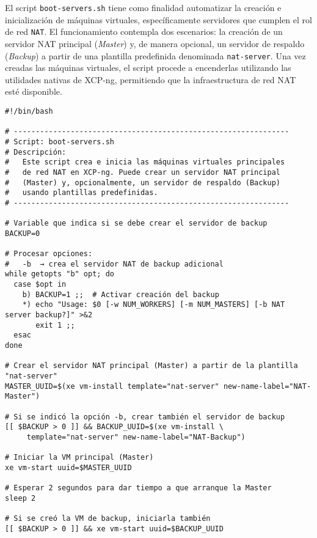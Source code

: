 El script \texttt{boot-servers.sh} tiene como finalidad automatizar la creación e inicialización de máquinas virtuales, específicamente servidores que cumplen el rol de red \texttt{NAT}. El funcionamiento contempla dos escenarios: la creación de un servidor NAT principal (\textit{Master}) y, de manera opcional, un servidor de respaldo (\textit{Backup}) a partir de una plantilla predefinida denominada \texttt{nat-server}. Una vez creadas las máquinas virtuales, el script procede a encenderlas utilizando las utilidades nativas de XCP-ng,  permitiendo que la infraestructura de red NAT esté disponible.

\begin{verbatim}
#!/bin/bash

# ---------------------------------------------------------------
# Script: boot-servers.sh
# Descripción:
#   Este script crea e inicia las máquinas virtuales principales 
#   de red NAT en XCP-ng. Puede crear un servidor NAT principal 
#   (Master) y, opcionalmente, un servidor de respaldo (Backup) 
#   usando plantillas predefinidas.
# ---------------------------------------------------------------

# Variable que indica si se debe crear el servidor de backup
BACKUP=0

# Procesar opciones:
#   -b  → crea el servidor NAT de backup adicional
while getopts "b" opt; do
  case $opt in
    b) BACKUP=1 ;;  # Activar creación del backup
    *) echo "Usage: $0 [-w NUM_WORKERS] [-m NUM_MASTERS] [-b NAT server backup?]" >&2
       exit 1 ;;
  esac
done

# Crear el servidor NAT principal (Master) a partir de la plantilla "nat-server"
MASTER_UUID=$(xe vm-install template="nat-server" new-name-label="NAT-Master")

# Si se indicó la opción -b, crear también el servidor de backup
[[ $BACKUP > 0 ]] && BACKUP_UUID=$(xe vm-install \
     template="nat-server" new-name-label="NAT-Backup")

# Iniciar la VM principal (Master)
xe vm-start uuid=$MASTER_UUID

# Esperar 2 segundos para dar tiempo a que arranque la Master
sleep 2

# Si se creó la VM de backup, iniciarla también
[[ $BACKUP > 0 ]] && xe vm-start uuid=$BACKUP_UUID
\end{verbatim}